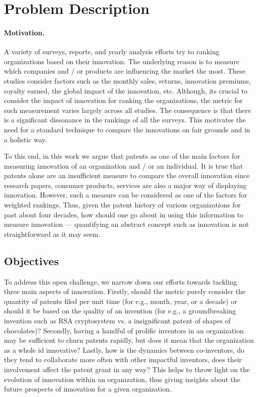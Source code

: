 \section{Problem Description}

\paragraph{Motivation.}

A variety of surveys, reports, and yearly analysis efforts try to ranking
organizations  based on their innovation. The underlying reason is to measure
which companies and / or products are influencing the market the most.  These
studies consider factors such as the monthly sales, returns, innovation
premiums, royalty earned, the global impact of the innovation, etc. Although,
its crucial to  consider the impact of innovation for ranking the
organizations, the metric for such measurement  varies largely across all
studies. The consequence is that there is a significant dissonance in the
rankings of all the surveys.  This motivates the need for a standard technique
to compare the innovations on fair grounds and in a holistic way. 

To this end, in this work we argue that patents as one of the main factors for
measuring innovation of an organization and / or an individual. It is true
that patents alone are an insufficient measure to compare the overall
innovation since research papers, consumer products, services are also a major
way of displaying innovation. However, such a measure can be considered as one
of the factors for weighted rankings. Thus, given the patent history of
various organizations for past about four decades,  how should one go about in
using this information to measure innovation --- quantifying an abstract
concept such as innovation is not straightforward as it may seem.  

\subsection{Objectives}

To address this open challenge, we narrow down our efforts towards tackling
three main  aspects of innovation. Firstly, should the metric purely consider
the quantity of patents filed per unit time (for e.g., month, year, or a
decade) or should it be based on the quality of an invention (for e.g., a
groundbreaking invention such as RSA cryptosystem vs. a insignificant patent
of shapes of chocolates)? Secondly, having a handful of prolific inventors in
an organization may be sufficient to churn patents rapidly, but does it mean
that the organization as a whole id innovative? Lastly, how is the dynamics
between co-inventors, do they tend to collaborate more often with other
impactful inventors, does their involvement affect the patent grant in any
way? This helps to throw light on the evolution of innovation within an
organization, thus giving insights about the future prospects of innovation
for a given organization.

